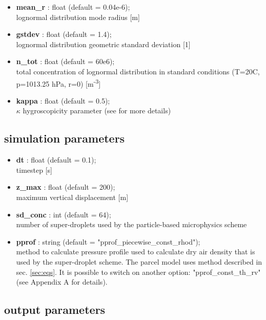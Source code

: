 \documentclass[11pt]{article}
\begin{document}
\begin{itemize}

  \item \textbf{mean\_r} : float (default = 0.04e-6);\\ lognormal distribution mode radius [m]
  \item \textbf{gstdev} : float (default = 1.4);\\ lognormal distribution geometric standard deviation [1]
  \item \textbf{n\_tot} : float (default = 60e6);\\ total concentration of lognormal distribution in standard conditions 
                               (T=20C, p=1013.25 hPa, r=0) [m\textsuperscript{-3}]
  \item \textbf{kappa} : float (default = 0.5);\\ $\kappa$ hygroscopicity parameter (see \citep{Petters_et_al_2007} for more details)

\end{itemize}

\subsection{simulation parameters}\label{sec:simpar}

\begin{itemize}

  \item \textbf{dt} : float (default = 0.1); \\ timestep [s]
  \item \textbf{z\_max} : float (default = 200); \\ maximum vertical displacement [m]
  \item \textbf{sd\_conc} : int (default = 64); \\ number of super-droplets used by the particle-based microphysics scheme
  \item \textbf{pprof} : string (default = "pprof\_piecewise\_const\_rhod"); \\ 
                method to calculate pressure profile used to calculate 
                dry air density that is used by the super-droplet scheme. The parcel model uses method described in sec. \ref{sec:eqs}. It is possible to switch on another option: "pprof\_const\_th\_rv" (see Appendix A for details).
\end{itemize}

\subsection{output parameters}\label{sec:output}
\end{document}
